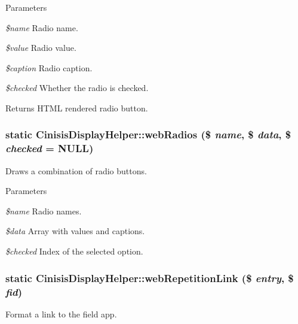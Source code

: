 \begin{DoxyParams}{Parameters}
\item[{\em \$name}]Radio name.\item[{\em \$value}]Radio value.\item[{\em \$caption}]Radio caption.\item[{\em \$checked}]Whether the radio is checked.\end{DoxyParams}
\begin{DoxyReturn}{Returns}
HTML rendered radio button. 
\end{DoxyReturn}
\hypertarget{classCinisisDisplayHelper_ac8c66caf42859ab8308aa40dfa33dbd0}{
\subsubsection[{webRadios}]{\setlength{\rightskip}{0pt plus 5cm}static CinisisDisplayHelper::webRadios (\$ {\em name}, \/  \$ {\em data}, \/  \$ {\em checked} = {\ttfamily NULL})}}
\label{classCinisisDisplayHelper_ac8c66caf42859ab8308aa40dfa33dbd0}
Draws a combination of radio buttons.


\begin{DoxyParams}{Parameters}
\item[{\em \$name}]Radio names.\item[{\em \$data}]Array with values and captions.\item[{\em \$checked}]Index of the selected option. \end{DoxyParams}
\hypertarget{classCinisisDisplayHelper_a1400c9d85878229fd02b3651ed9e0d63}{
\subsubsection[{webRepetitionLink}]{\setlength{\rightskip}{0pt plus 5cm}static CinisisDisplayHelper::webRepetitionLink (\$ {\em entry}, \/  \$ {\em fid})}}
\label{classCinisisDisplayHelper_a1400c9d85878229fd02b3651ed9e0d63}
Format a link to the field app.


